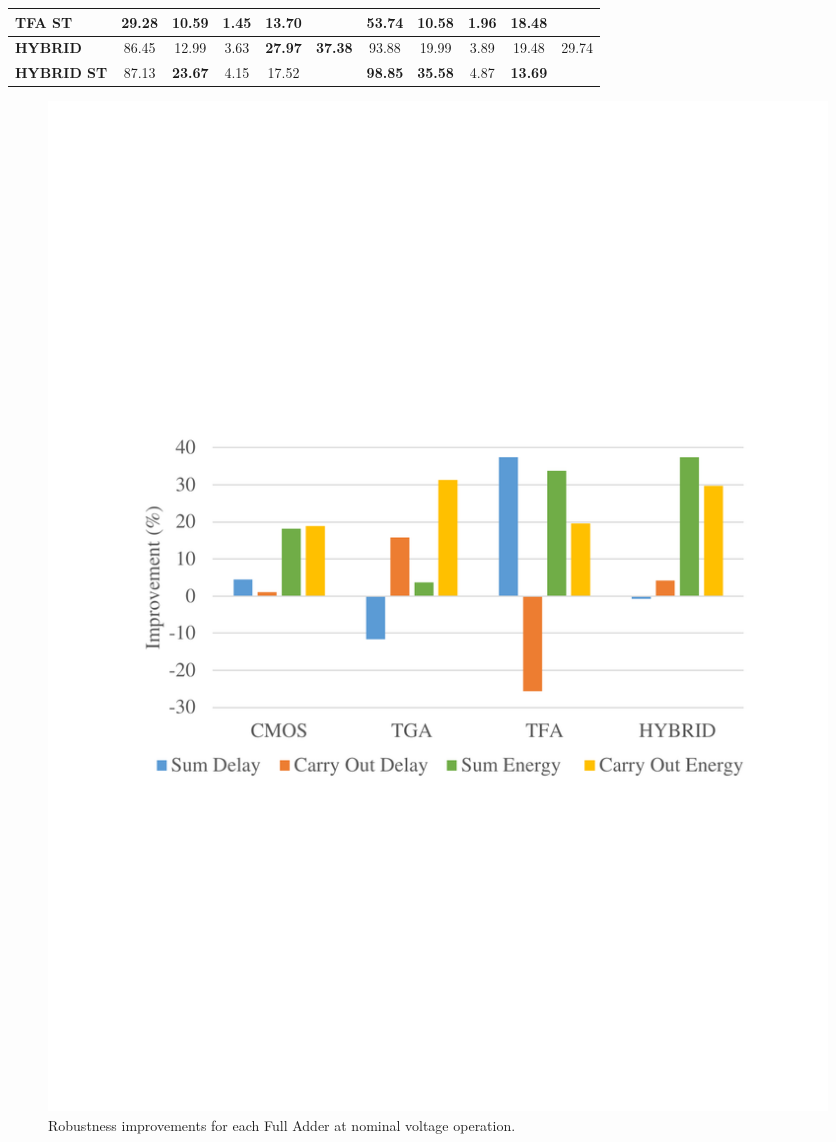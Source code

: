 \documentclass[ecp,tc, english]{iiufrgs}
\begin{document}
\begin{table}[!htbp]
{\begin{tabular}{lcccccccccc}
\textbf{TFA ST}                   & 29.28          & 10.59          & 1.45          & \textbf{13.70} &                                 & 53.74          & 10.58          & 1.96          & 18.48          &                                 \\ \hline
\textbf{HYBRID}                   & 86.45          & 12.99          & 3.63          & \textbf{27.97} & \multirow{2}{*}{\textbf{37.38}} & 93.88          & 19.99          & 3.89          & 19.48          & \multirow{2}{*}{29.74}          \\ \cline{1-5} \cline{7-10}
\textbf{HYBRID ST}                & 87.13          & \textbf{23.67} & 4.15          & 17.52          &                                 & \textbf{98.85} & \textbf{35.58} & 4.87          & \textbf{13.69} &                                 \\ \hline
\end{tabular}%
}
\end{table}

\begin{figure}[H]
\centering
\includegraphics[width=\textwidth, trim={0 9cm 0 9cm},clip]{improvNominal.pdf}
\caption{Robustness improvements for each Full Adder at nominal voltage operation.}
\label{fig:improvNominal}
\end{figure}
\end{document}
